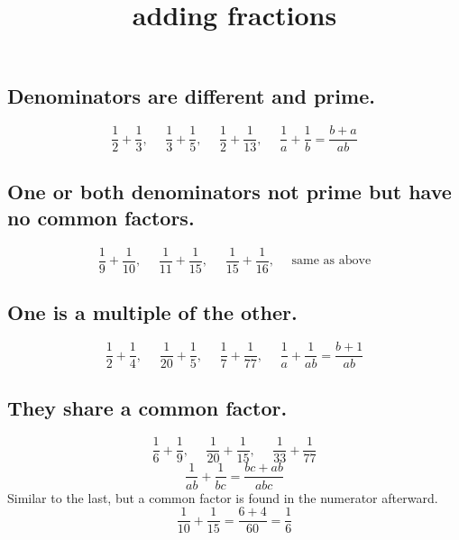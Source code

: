 \documentclass[11pt, oneside]{article}
\title{adding fractions}
\date{}
\begin{document}
\maketitle
\Large

\subsection*{Denominators are different and prime.}
\[ \frac{1}{2} + \frac{1}{3}, \ \ \ \ \ \  \frac{1}{3} + \frac{1}{5}, \ \ \ \ \ \   \frac{1}{2} + \frac{1}{13} , \ \ \ \ \ \    \frac{1}{a} + \frac{1}{b} = \frac{b + a}{ab} \]
\subsection*{One or both denominators not prime but have no common factors.}
\[ \frac{1}{9} + \frac{1}{10}, \ \ \ \ \ \  \frac{1}{11} + \frac{1}{15}, \ \ \ \ \ \   \frac{1}{15} + \frac{1}{16} , \ \ \ \ \ \   \text{same as above} \]
\subsection*{One is a multiple of the other.}
\[ \frac{1}{2} + \frac{1}{4}, \ \ \ \ \ \  \frac{1}{20} + \frac{1}{5}, \ \ \ \ \ \   \frac{1}{7} + \frac{1}{77} , \ \ \ \ \ \    \frac{1}{a} + \frac{1}{ab} = \frac{b+1}{ab} \]
\subsection*{They share a common factor.}
\[ \frac{1}{6} + \frac{1}{9}, \ \ \ \ \ \  \frac{1}{20} + \frac{1}{15}, \ \ \ \ \ \   \frac{1}{33} + \frac{1}{77} \]
\[ \frac{1}{ab} + \frac{1}{bc} = \frac{bc+ab}{abc} \]
Similar to the last, but a common factor is found in the numerator afterward.
\[ \frac{1}{10} + \frac{1}{15} = \frac{6 + 4}{60} = \frac{1}{6} \]
\end{document}
